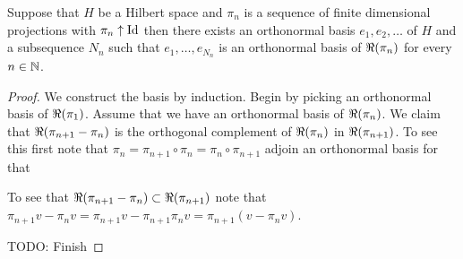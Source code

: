 \begin{prop}\label{FDPAdaptedBasis}Suppose that $H$ be a Hilbert space and $\pi_n$ is a sequence of finite dimensional projections with $\pi_n \uparrow \operatorname*{Id}$ then there exists an  orthonormal basis $e_1, e_2, \dotsc$ of $H$ and a subsequence $N_n$ such that $e_1,\dotsc, e_{N_n}$ is an orthonormal basis of $\Re(\pi_n)$ for every $n \in \mathbb{N}$.
\end{prop}
\begin{proof}
We construct the basis by induction.  Begin by picking an orthonormal basis of $\Re(\pi_1)$.  Assume that we have an orthonormal basis of $\Re(\pi_n)$.
We claim that $\Re(\pi_{n+1} - \pi_n)$ is the orthogonal complement of $\Re(\pi_n)$ in $\Re(\pi_{n+1})$.  To see this first note that $\pi_n = \pi_{n+1} \circ \pi_n = \pi_n \circ \pi_{n+1}$  adjoin an orthonormal basis for that 

To see that $\Re(\pi_{n+1} - \pi_n) \subset \Re(\pi_{n+1})$ note that $\pi_{n+1} v - \pi_n v = \pi_{n+1} v - \pi_{n+1} \pi_{n} v = \pi_{n+1}(v - \pi_n v)$.

TODO: Finish
\end{proof}


